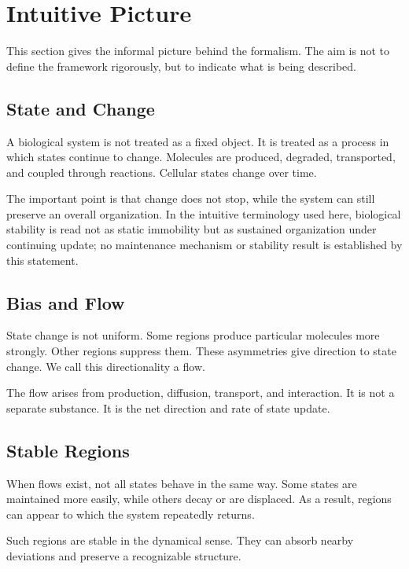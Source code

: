 \section{Intuitive Picture}

This section gives the informal picture behind the formalism. The aim is not to define the framework rigorously, but to indicate what is being described.

\subsection{State and Change}

A biological system is not treated as a fixed object. It is treated as a process in which states continue to change. Molecules are produced, degraded, transported, and coupled through reactions. Cellular states change over time.

The important point is that change does not stop, while the system can still preserve an overall organization. In the intuitive terminology used here, biological stability is read not as static immobility but as sustained organization under continuing update; no maintenance mechanism or stability result is established by this statement.

\subsection{Bias and Flow}

State change is not uniform. Some regions produce particular molecules more strongly. Other regions suppress them. These asymmetries give direction to state change. We call this directionality a flow.

The flow arises from production, diffusion, transport, and interaction. It is not a separate substance. It is the net direction and rate of state update.

\subsection{Stable Regions}

When flows exist, not all states behave in the same way. Some states are maintained more easily, while others decay or are displaced. As a result, regions can appear to which the system repeatedly returns.

Such regions are stable in the dynamical sense. They can absorb nearby deviations and preserve a recognizable structure.

